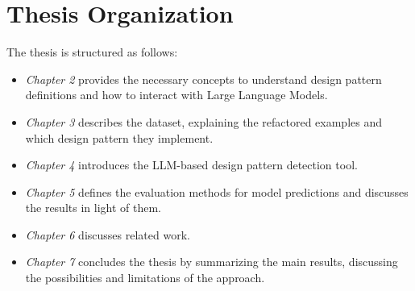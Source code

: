 \section{Thesis Organization}\label{sec:thesis-organization}
The thesis is structured as follows:
\begin{itemize}
    \item \emph{Chapter 2} provides the necessary concepts to understand design pattern definitions and how to interact with Large Language Models.
    \item \emph{Chapter 3} describes the dataset, explaining the refactored examples and which design pattern they implement.
    \item \emph{Chapter 4} introduces the LLM-based design pattern detection tool.
    \item \emph{Chapter 5} defines the evaluation methods for model predictions and discusses the results in light of them.
    \item \emph{Chapter 6} discusses related work.
    \item \emph{Chapter 7} concludes the thesis by summarizing the main results, discussing the possibilities and limitations of the approach.
\end{itemize}




